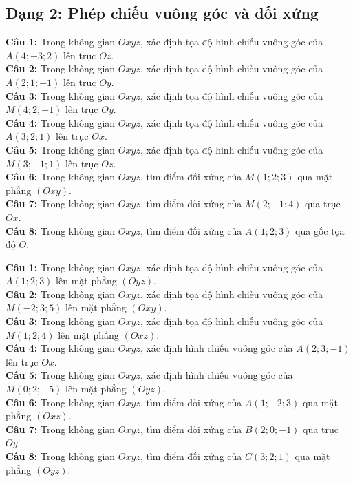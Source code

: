 \documentclass[12pt]{article}
\begin{document}
	\subsection{Dạng 2: Phép chiếu vuông góc và đối xứng}
	\begin{btxanh}
		\noindent \textbf{Câu 1:} Trong không gian $Oxyz$, xác định tọa độ hình chiếu vuông góc của $A(4; -3; 2)$ lên trục $Oz$. \\
		\noindent \textbf{Câu 2:} Trong không gian $Oxyz$, xác định tọa độ hình chiếu vuông góc của $A(2; 1; -1)$ lên trục $Oy$. \\
		\noindent \textbf{Câu 3:} Trong không gian $Oxyz$, xác định tọa độ hình chiếu vuông góc của $M(4; 2; -1)$ lên trục $Oy$. \\
		\noindent \textbf{Câu 4:} Trong không gian $Oxyz$, xác định tọa độ hình chiếu vuông góc của $A(3; 2; 1)$ lên trục $Ox$. \\
		\noindent \textbf{Câu 5:} Trong không gian $Oxyz$, xác định tọa độ hình chiếu vuông góc của $M(3; -1; 1)$ lên trục $Oz$. \\
		\noindent \textbf{Câu 6:} Trong không gian $Oxyz$, tìm điểm đối xứng của $M(1; 2; 3)$ qua mặt phẳng $(Oxy)$. \\
		\noindent \textbf{Câu 7:} Trong không gian $Oxyz$, tìm điểm đối xứng của $M(2; -1; 4)$ qua trục $Ox$. \\
		\noindent \textbf{Câu 8:} Trong không gian $Oxyz$, tìm điểm đối xứng của $A(1; 2; 3)$ qua gốc tọa độ $O$.
	\end{btxanh}
	
	\begin{btvang}
		\noindent \textbf{Câu 1:} Trong không gian $Oxyz$, xác định tọa độ hình chiếu vuông góc của $A(1; 2; 3)$ lên mặt phẳng $(Oyz)$. \\
		\noindent \textbf{Câu 2:} Trong không gian $Oxyz$, xác định tọa độ hình chiếu vuông góc của $M(-2; 3; 5)$ lên mặt phẳng $(Oxy)$. \\
		\noindent \textbf{Câu 3:} Trong không gian $Oxyz$, xác định tọa độ hình chiếu vuông góc của $M(1; 2; 4)$ lên mặt phẳng $(Oxz)$. \\
		\noindent \textbf{Câu 4:} Trong không gian $Oxyz$, xác định hình chiếu vuông góc của $A(2; 3; -1)$ lên trục $Ox$. \\
		\noindent \textbf{Câu 5:} Trong không gian $Oxyz$, xác định hình chiếu vuông góc của $M(0; 2; -5)$ lên mặt phẳng $(Oyz)$. \\
		\noindent \textbf{Câu 6:} Trong không gian $Oxyz$, tìm điểm đối xứng của $A(1; -2; 3)$ qua mặt phẳng $(Oxz)$. \\
		\noindent \textbf{Câu 7:} Trong không gian $Oxyz$, tìm điểm đối xứng của $B(2; 0; -1)$ qua trục $Oy$. \\
		\noindent \textbf{Câu 8:} Trong không gian $Oxyz$, tìm điểm đối xứng của $C(3; 2; 1)$ qua mặt phẳng $(Oyz)$.
	\end{btvang}
	
\end{document}
